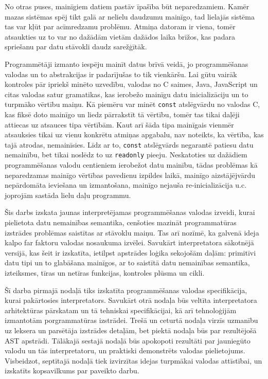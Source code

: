 \documentclass[12pt,a4paper]{report}
\begin{document}
No otras puses, mainīgiem datiem pastāv īpašība būt neparedzamiem. Kamēr mazas sistēmas spēj tikt galā ar nelielu daudzumu mainīgo, tad lielajās sistēma tas var kļūt par acīmredzamu problēmu. Atmiņa datoram ir viena, tomēr atsaukties uz to var no dažādām vietām dažādos laika brīžos, kas padara spriešanu par datu stāvokli daudz sarežģītāk.  

Programmētāji izmanto iespēju mainīt datus brīvā veidā, jo  programmēšanas valodas un to abstrakcijas ir padarījušas to tik vienkāršu. Lai gūtu vairāk kontroles pār ipriekš minēto uzvedību, valodas no C saimes, Java, JavaScript un citas valodas satur gramatikas, kas ierobežo mainīgu datu inicializāciju un to turpmāko vērtību maiņu. Kā piemēru var minēt \texttt{const} atslēgvārdu no valodas C, kas fiksē doto mainīgo un liedz pārrakstīt tā vērtību, tomēr tas tikai daļēji attiecas uz atsauces tipa vērtībām. Kaut arī šāda tipa mainīgais vienmēr atsauksies tikai uz vienu konkrētu atmiņas apgabalu, nav noteikts, ka vērtība, kas tajā atrodas, nemainīsies. Līdz ar to, \texttt{const} atslēgvārds negarantē patiesu datu nemainību, bet tikai noslēdz to uz \texttt{readonly} pieeju.
Neskatoties uz dažādiem programmēšanas valodu centieniem ierobežot datu mainību, tādas problēmas kā neparedzamas mainīgo vērtības pavedienu izpildes laikā, mainīgo aizstājējvārdu nepārdomāta ieviešana un izmantošana, mainīgo nejauša re-inicializācija u.c. joprojām sastāda lielu daļu programmu.\cite{immutability}

Šis darbs izskata jaunas interpretējamas programmēšanas valodas izveidi, kurai pielietota datu nemainības semantika, cenšoties mazināt programmatūras izstrādes problēmas saistītas ar stāvoklu maiņu. Tas arī nozīmē, ka galvenā ideja kalpo far faktoru valodas nosaukuma izvēlei. Savukārt interpretatora sākotnējā versijā, kas šeit ir izskatīta, ietilpst apstrādes loģika sekojošām daļām: primitīvi datu tipi un to glabāšana mainīgos, ar to saistītā datu nemainības semantika, izteiksmes, tīras un netīras funkcijas, kontroles plūsma un cikli.


Šī darba pirmajā nodaļā tiks izskatīta programmēšanas valodas specifikācija, kurai pakārtosies interpretators. Savukārt otrā nodaļa būs veltīta interpretatora arhitektūras pārskatam un tā tehniskai specifikācijai, kā arī tehnoloģijām izmantotām porgrammatūras izstrādei. Trešā un ceturtā nodaļa virzīs uzmanību uz leksera un parsētāja izstrādes detaļām, bet piektā nodaļa būs par rezultējošā AST apstrādi. Tālākajā sestajā nodaļā būs apokopoti rezultāti par jauniegūto valodu un tās interpretatoru, un praktiski demonstrēts valodas pielietojums. Visbeidzot, septītajā nodaļā tiek izvirzītas idejas turpmākai valodas attīstībai, un izskatīts kopsavilkums par paveikto darbu.
\end{document}
